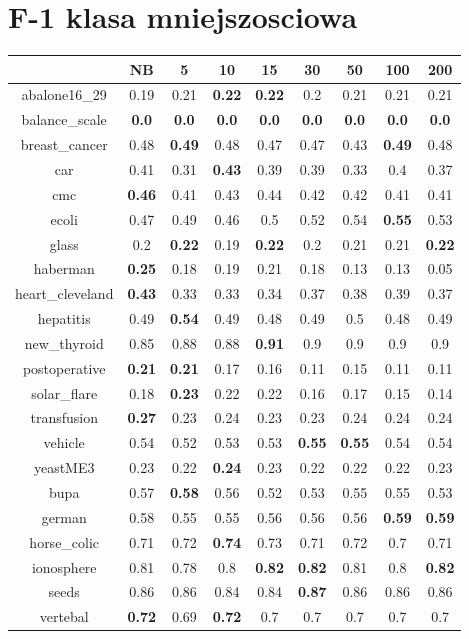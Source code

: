 \documentclass{article}%
\begin{document}
%
\section*{F{-}1 klasa mniejszosciowa}%
\begin{tabular}{c|cccccccc}%
\hline%
&NB&5&10&15&30&50&100&200\\%
\hline%
abalone16\_29&0.19&0.21&\textbf{0.22}&\textbf{0.22}&0.2&0.21&0.21&0.21\\%
\hline%
balance\_scale&\textbf{0.0}&\textbf{0.0}&\textbf{0.0}&\textbf{0.0}&\textbf{0.0}&\textbf{0.0}&\textbf{0.0}&\textbf{0.0}\\%
\hline%
breast\_cancer&0.48&\textbf{0.49}&0.48&0.47&0.47&0.43&\textbf{0.49}&0.48\\%
\hline%
car&0.41&0.31&\textbf{0.43}&0.39&0.39&0.33&0.4&0.37\\%
\hline%
cmc&\textbf{0.46}&0.41&0.43&0.44&0.42&0.42&0.41&0.41\\%
\hline%
ecoli&0.47&0.49&0.46&0.5&0.52&0.54&\textbf{0.55}&0.53\\%
\hline%
glass&0.2&\textbf{0.22}&0.19&\textbf{0.22}&0.2&0.21&0.21&\textbf{0.22}\\%
\hline%
haberman&\textbf{0.25}&0.18&0.19&0.21&0.18&0.13&0.13&0.05\\%
\hline%
heart\_cleveland&\textbf{0.43}&0.33&0.33&0.34&0.37&0.38&0.39&0.37\\%
\hline%
hepatitis&0.49&\textbf{0.54}&0.49&0.48&0.49&0.5&0.48&0.49\\%
\hline%
new\_thyroid&0.85&0.88&0.88&\textbf{0.91}&0.9&0.9&0.9&0.9\\%
\hline%
postoperative&\textbf{0.21}&\textbf{0.21}&0.17&0.16&0.11&0.15&0.11&0.11\\%
\hline%
solar\_flare&0.18&\textbf{0.23}&0.22&0.22&0.16&0.17&0.15&0.14\\%
\hline%
transfusion&\textbf{0.27}&0.23&0.24&0.23&0.23&0.24&0.24&0.24\\%
\hline%
vehicle&0.54&0.52&0.53&0.53&\textbf{0.55}&\textbf{0.55}&0.54&0.54\\%
\hline%
yeastME3&0.23&0.22&\textbf{0.24}&0.23&0.22&0.22&0.22&0.23\\%
\hline%
bupa&0.57&\textbf{0.58}&0.56&0.52&0.53&0.55&0.55&0.53\\%
\hline%
german&0.58&0.55&0.55&0.56&0.56&0.56&\textbf{0.59}&\textbf{0.59}\\%
\hline%
horse\_colic&0.71&0.72&\textbf{0.74}&0.73&0.71&0.72&0.7&0.71\\%
\hline%
ionosphere&0.81&0.78&0.8&\textbf{0.82}&\textbf{0.82}&0.81&0.8&\textbf{0.82}\\%
\hline%
seeds&0.86&0.86&0.84&0.84&\textbf{0.87}&0.86&0.86&0.86\\%
\hline%
vertebal&\textbf{0.72}&0.69&\textbf{0.72}&0.7&0.7&0.7&0.7&0.7\\%
\hline%
\end{tabular}
\end{document}
